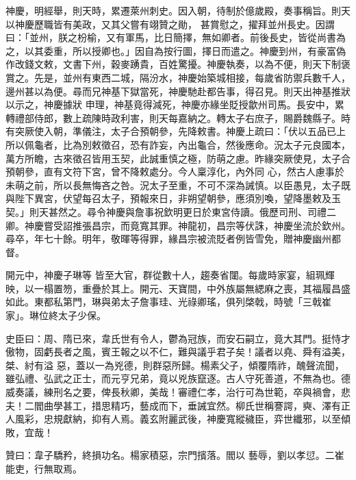 \begin{pinyinscope}
 神慶，明經舉，則天時，累遷萊州刺史。因入朝，待制於億歲殿，奏事稱旨。則天以神慶歷職皆有美政，又其父嘗有翊贊之勛，
 甚賞慰之，擢拜並州長史。因謂曰：「並州，朕之枌榆，又有軍馬，比日簡擇，無如卿者。前後長史，皆從尚書為之，以其委重，所以授卿也。」因自為按行圖，擇日而遣之。神慶到州，有豪富偽作改錢文敕，文書下州，穀麥踴貴，百姓驚擾。神慶執奏，以為不便，則天下制褒賞之。先是，並州有東西二城，隔汾水，神慶始築城相接，每歲省防禦兵數千人，邊州甚以為便。尋而兄神基下獄當死，神慶馳赴都告事，得召見。則天出神基推狀以示之，神慶據狀
 申理，神基竟得減死，神慶亦緣坐貶授歙州司馬。長安中，累轉禮部侍郎，數上疏陳時政利害，則天每嘉納之。轉太子右庶子，賜爵魏縣子。時有突厥使入朝，準儀注，太子合預朝參，先降敕書。神慶上疏曰：「伏以五品已上所以佩龜者，比為別敕徵召，恐有詐妄，內出龜合，然後應命。況太子元良國本，萬方所瞻，古來徵召皆用玉契，此誠重慎之極，防萌之慮。昨緣突厥使見，太子合預朝參，直有文符下宮，曾不降敕處分。今人稟淳化，內外同
 心，然古人慮事於未萌之前，所以長無悔吝之咎。況太子至重，不可不深為誡慎。以臣愚見，太子既與陛下異宮，伏望每召太子，預報來日，非朔望朝參，應須別喚，望降墨敕及玉契。」則天甚然之。尋令神慶與詹事祝欽明更日於東宮侍讀。俄歷司刑、司禮二卿。神慶嘗受詔推張昌宗，而竟寬其罪。神龍初，昌宗等伏誅，神慶坐流於欽州。尋卒，年七十餘。明年，敬暉等得罪，緣昌宗被流貶者例皆雪免，贈神慶幽州都督。



 開元中，神慶子琳等
 皆至大官，群從數十人，趨奏省闥。每歲時家宴，組珮輝映，以一榻置笏，重疊於其上。開元、天寶間，中外族屬無緦麻之喪，其福履昌盛如此。東都私第門，琳與弟太子詹事珪、光祿卿瑤，俱列棨戟，時號「三戟崔家」。琳位終太子少保。



 史臣曰：周、隋已來，韋氏世有令人，鬱為冠族，而安石嗣立，竟大其門。挺恃才傲物，固虧長者之風，賓王報之以不仁，難與議乎君子矣！議者以堯、舜有溢美，桀、紂有溢
 惡，蓋以一為兇德，則群惡所歸。楊素父子，傾覆隋祚，醜聲流聞，雖弘禮、弘武之正士，而元亨兄弟，竟以兇族竄逐。古人守死善道，不無為也。德威奏議，練刑名之要，俾長秋卿，美哉！審禮仁孝，治行可為世範，卒與禍會，悲夫！二閻曲學甚工，措思精巧，藝成而下，垂誡宜然。柳氏世稱謇諤，奭、澤有正人風彩，忠規獻納，抑有人焉。義玄附麗武後，神慶寬縱穢臣，弈世纖邪，以至傾敗，宜哉！



 贊曰：韋子驕矜，終損功名。楊家積惡，宗門擯落。閻以
 藝辱，劉以孝愆。二崔能吏，行無取焉。



\end{pinyinscope}